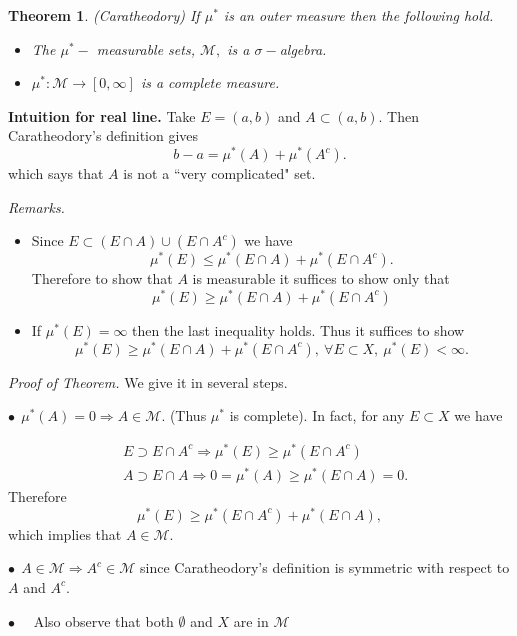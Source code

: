 \documentclass[12pt]{report}
\newtheorem{theorem}{Theorem}[section]
\begin{document}
\medskip
\noindent
\begin{theorem} (Caratheodory)  If $\mu^*$ is an outer measure then the
following  hold.
\begin{itemize} 
\item[a.]  The $\mu^*-$ measurable sets,
$\mathcal{M},  $ is a $\sigma-$algebra.
\item[b.] $\mu^*: \mathcal{M} \longrightarrow [0, \infty] $ is a complete
measure.
\end{itemize}
\end{theorem}
{\bf  Intuition for real line.}  Take $E = (a, b)$ and $A \subset (a, b)$.
Then Caratheodory's  definition gives
\[
 b - a = \mu^*(A) + \mu^*(A^c).
\] which says that $A$ is not a ``very complicated" set.

\medskip
\noindent
\textit{Remarks.}
\begin{itemize}
\item[1.]  Since $E \subset (E \cap A) \cup (E \cap A^c)$ we have
\[
\mu^* (E) \le \mu^* (E \cap A) + \mu^*(E \cap A^c).
\] Therefore to show that $A$ is measurable it suffices to show only that 
\[
\mu^* (E) \ge \mu^* (E \cap A) + \mu^*(E \cap A^c)
\]
\item[2.]  If $\mu^* (E) = \infty$ then the last  inequality holds. Thus it
suffices to show
\[
\mu^* (E) \ge \mu^* (E \cap A) + \mu^*(E \cap A^c), \ \forall E \subset X, \
\mu^* (E) < \infty.
\]
\end{itemize}

\medskip
\noindent
\textit{Proof of Theorem.}  We give it in several steps.

\medskip
\noindent
$\bullet \ \ \mu^* (A) = 0 \Longrightarrow A \in \mathcal{M}$.   (Thus
$\mu^*$ is complete).  In fact, for any $E \subset X$ we have

\begin{eqnarray*} &E \supset E \cap A^c \Longrightarrow \mu^* (E) \ge
\mu^* (E \cap A^c)\\ &A \supset E \cap A \Longrightarrow 0 = \mu^* (A)
\ge \mu^*(E
\cap A) = 0.
\end{eqnarray*} Therefore
\[
\mu^* (E) \ge \mu^*(E \cap A^c) + \mu^*(E \cap A),
\] which implies that $A \in \mathcal{M}$.


\smallskip
\noindent
$\bullet \ \ A \in \mathcal{M} \Longrightarrow A^c \in \mathcal{M}$ since
Caratheodory's definition is symmetric with respect to $A$ and $A^c$.

\smallskip
\noindent
$\bullet$ \ \ Also observe that both $\emptyset$ and $X$ are in
$\mathcal{M}$
\end{document}
